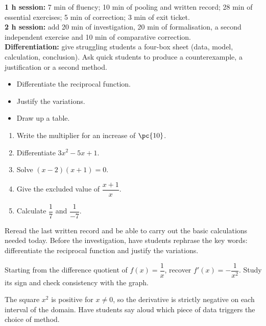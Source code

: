 \ifmxteacher
\begin{method}
\textbf{1 h session:} 7 min of fluency; 10 min of pooling and written record; 28 min of essential exercises; 5 min of correction; 3 min of exit ticket.\\
\textbf{2 h session:} add 20 min of investigation, 20 min of formalisation, a second independent exercise and 10 min of comparative correction.\\
\textbf{Differentiation:} give struggling students a four-box sheet (data, model, calculation, conclusion). Ask quick students to produce a counterexample, a justification or a second method.
\end{method}
\fi
{}
\begin{objectives}\begin{itemize}\item Differentiate the reciprocal function.\item Justify the variations.\item Draw up a table.\end{itemize}\end{objectives}
\begin{fluency}\begin{enumerate}\item Write the multiplier for an increase of $\pc{10}$. \item Differentiate $3x^2-5x+1$. \item Solve $(x-2)(x+1)=0$. \item Give the excluded value of $\dfrac{x+1}{x}$. \item Calculate $\dfrac1{7}$ and $\dfrac1{-7}$. \end{enumerate}\end{fluency}
\begin{prerequisites}Reread the last written record and be able to carry out the basic calculations needed today. Before the investigation, have students rephrase the key words: differentiate the reciprocal function and justify the variations.\end{prerequisites}

\begin{activity}
Starting from the difference quotient of $f(x)=\dfrac1x$, recover $f'(x)=-\dfrac1{x^2}$. Study its sign and check consistency with the graph.

\end{activity}
\begin{solution}The square $x^2$ is positive for $x\neq0$, so the derivative is strictly negative on each interval of the domain. Have students say aloud which piece of data triggers the choice of method.\end{solution}

